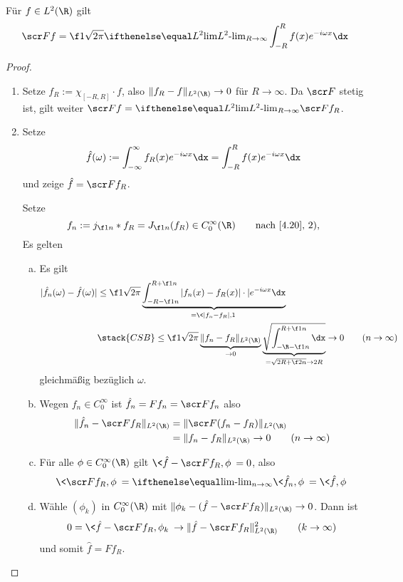\begin{st} \label{4.23}
	Für $f \in L^2(\R)$ gilt
	\[
		\scr F f = \f 1{\sqrt{2\pi}} \lim[L^2]_{R\to\infty} \int_{-R}^R f(x)e^{-i\omega x} \dx
	\]
	\begin{proof}
		\begin{enumerate}[1)]
			\item
				Setze $f_R := \chi_{[-R,R]} \cdot f$, also $\|f_R - f\|_{L^2(\R)} \to 0$ für $R \to \infty$.
				Da $\scr F$ stetig ist, gilt weiter $\scr F f = \lim[L^2]_{R\to\infty} \scr F f_R$.
			\item
				Setze 
				\[
					\hat f(\omega)  := \int_{-\infty}^\infty f_R(x) e^{-i\omega x} \dx
					= \int_{-R}^R f(x) e^{-i\omega x} \dx
				\]
				und zeige $\hat f = \scr F f_R$.
							
				Setze 
				\[
					f_n := j_{\f 1n} \ast f_R 
					= J_{\f 1n} (f_R) \in C_0^\infty(\R) \qquad \text{nach \ref{4.20}, 2)},
				\]
				Es gelten
				\begin{enumerate}[a)]
					\item
						Es gilt
						\begin{align*}
							|\hat f_n(\omega) - \hat f(\omega)|
							& \le \f 1{\sqrt{2\pi}} \underbrace{\int_{-R-\f 1n}^{R+\f 1n} |f_n(x) - f_R(x)|\cdot |e^{-i\omega x} \dx}_{= \<|f_n-f_R|,1\>} \\
							&\stack{CSB}\le \f 1{\sqrt{2\pi}} \underbrace{\|f_n - f_R\|_{L^2(\R)}}_{\to 0} \underbrace{\sqrt{\int_{-\R-\f 1n}^{R+\f 1n} \dx}}_{= \sqrt{2R + \f 2n} \to 2R}
							\to 0 \qquad (n\to \infty)
						\end{align*}
						gleichmäßig bezüglich $\omega$.
					\item
						Wegen $f_n \in C_0^\infty$ ist $\hat f_n = F f_n = \scr F f_n$ also
						\begin{align*}
							\|\hat f_n - \scr F f_R\|_{L^2(\R)}
							&= \|\scr F(f_n -f_R)\|_{L^2(\R)} \\
							&= \|f_n - f_R\|_{L^2(\R)}
							\to 0 \qquad (n\to \infty)
						\end{align*}
					\item
						Für alle $\phi \in C_0^\infty(\R)$ gilt $\<\hat f - \scr F f_R, \phi\> = 0$, also
						\begin{align*}
							\< \scr F f_R, \phi\> = \lim_{n\to\infty} \<\hat f_n, \phi\>
							= \<\hat f, \phi\>
						\end{align*}
					\item
						Wähle $(\phi_k)$ in $C_0^\infty(\R)$ mit $\|\phi_k - (\hat f - \scr F f_R)\|_{L^2(\R)} \to 0$.
						Dann ist
						\[
							0 = \<\hat f - \scr F f_R, \phi_k\> \to \|\hat f - \scr F f_R\|_{L^2(\R)}^2 \qquad (k\to \infty)
						\]
						und somit $\hat f = F f_R$.
				\end{enumerate}
		\end{enumerate}

	\end{proof}
\end{st}

